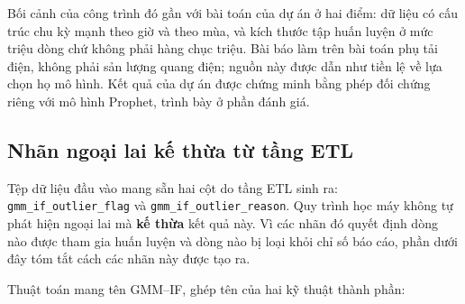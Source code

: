 \documentclass[12pt, a4paper]{report}
\begin{document}
\begin{table}[htbp]
\centering

\small
{}
\caption[Sai số RMSE trích từ Bảng $4$ của Roy, Pyltsov và Hu, chỉ số càng nhỏ càng tốt]{Sai số RMSE trích từ Bảng $4$ của Roy, Pyltsov và Hu~\cite{roy2025hourly}, chỉ số
càng nhỏ càng tốt. Cột XGBoost là mô hình cây tăng cường gradient, các cột còn lại là kiến
trúc học sâu. Dấu $\times$ là cấu hình bài báo không chạy được.}
\label{tab:roy_rmse}
\end{table}


Bối cảnh của công trình đó gần với bài toán của dự án ở hai điểm: dữ liệu có cấu trúc
chu kỳ mạnh theo giờ và theo mùa, và kích thước tập huấn luyện ở mức triệu dòng chứ không
phải hàng chục triệu. Bài báo
làm trên bài toán phụ tải điện, không phải sản lượng quang điện; nguồn này được dẫn
như tiền lệ về lựa chọn họ mô hình. Kết quả của dự án được
chứng minh bằng phép đối chứng riêng với mô hình Prophet, trình bày ở phần đánh giá.

\FloatBarrier
\subsection{Nhãn ngoại lai kế thừa từ tầng ETL}

Tệp dữ liệu đầu vào mang sẵn hai cột do tầng ETL sinh ra:
\texttt{gmm\_if\_outlier\_flag} và \texttt{gmm\_if\_outlier\_reason}. Quy trình học máy không tự
phát hiện ngoại lai mà \textbf{kế thừa} kết quả này. Vì các nhãn đó quyết định dòng
nào được tham gia huấn luyện và dòng nào bị loại khỏi chỉ số báo cáo, phần dưới đây tóm
tắt cách các nhãn này được tạo ra.

Thuật toán mang tên GMM--IF, ghép tên của hai kỹ thuật thành phần:
\end{document}
